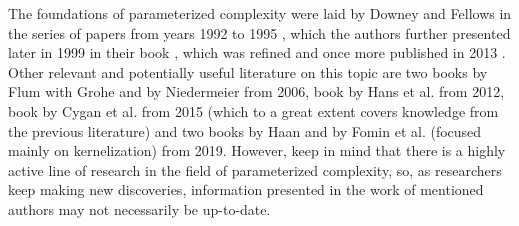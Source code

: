 The foundations of parameterized complexity were laid by Downey and Fellows
in the series of papers from years 1992 to 1995 \cite{Downey1995.1,Downey1995.2,Downey1993,Downey1995.4},
which the authors further presented later in 1999 in their book \cite{Downey1999},
which was refined and once more published in 2013 \cite{Downey2013}.
Other relevant and potentially useful literature on this topic are
two books by Flum with Grohe \cite{Flum2006} and by Niedermeier \cite{Niedermeier2006} from 2006, book by Hans et al. \cite{Hans2012} from 2012,
book by Cygan et al. \cite{Cygan2015} from 2015 (which to a great extent covers knowledge from the previous literature)
and two books by Haan \cite{Haan2019} and by Fomin et al. (focused mainly on kernelization) \cite{Fomin2019} from 2019.
However, keep in mind that there is a highly active line of research in the field of parameterized complexity, so,
as researchers keep making new discoveries, information presented in the work of mentioned authors may not necessarily be up-to-date.

